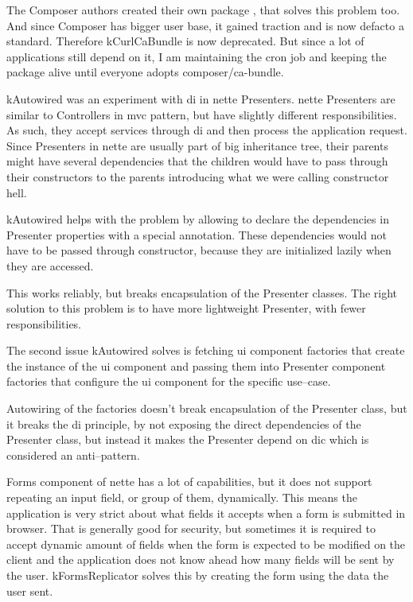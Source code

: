 The Composer authors created their own package , that solves this problem too. And since Composer has bigger user base, it gained traction and is now defacto a standard. Therefore \gls{kCurlCaBundle} is now deprecated. But since a lot of applications still depend on it, I am maintaining the cron job and keeping the package alive until everyone adopts composer/ca-bundle.

 \label{sec:state:autowired}

\gls{kAutowired} was an experiment with \gls{di} in \gls{nette} Presenters. \gls{nette} Presenters are similar to Controllers in \gls{mvc} pattern, but have slightly different responsibilities. As such, they accept services through \gls{di} and then process the application request. Since Presenters in \gls{nette} are usually part of big inheritance tree, their parents might have several dependencies that the children would have to pass through their constructors to the parents introducing what we were calling constructor hell.

\gls{kAutowired} helps with the problem by allowing to declare the dependencies in Presenter properties with a special annotation. These dependencies would not have to be passed through constructor, because they are initialized lazily when they are accessed.

This works reliably, but breaks encapsulation of the Presenter classes. The right solution to this problem is to have more lightweight Presenter, with fewer responsibilities.

The second issue \gls{kAutowired} solves is fetching \gls{ui} component factories that create the instance of the \gls{ui} component and passing them into Presenter component factories that configure the \gls{ui} component for the specific use--case.

Autowiring of the factories doesn't break encapsulation of the Presenter class, but it breaks the \gls{di} principle, by not exposing the direct dependencies of the Presenter class, but instead it makes the Presenter depend on \gls{dic} which is considered an anti--pattern.

 \label{sec:state:forms-replicator}

Forms component of \gls{nette} has a lot of capabilities, but it does not support repeating an input field, or group of them, dynamically. This means the application is very strict about what fields it accepts when a form is submitted in browser. That is generally good for security, but sometimes it is required to accept dynamic amount of fields when the form is expected to be modified on the client and the application does not know ahead how many fields will be sent by the user. \gls{kFormsReplicator} solves this by creating the form using the data the user sent.

